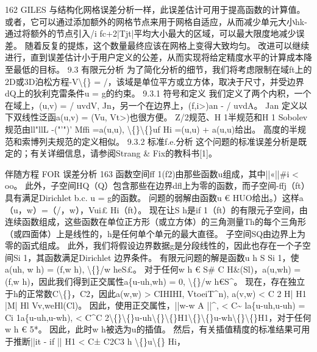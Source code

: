 \documentclass[UTF8,11pt,a4paper,openany,fontset=fandol]{ctexbook}
\begin{document}
162 GILES 与结构化网格误差分析一样，此误差估计可用于提高函数的计算值。 或者，它可以通过添加额外的网格节点来用于网格自适应，从而减少单元大小hk-通过将额外的节点引入/i fc+2|Tjt|平均大小最大的区域，可以最大限度地减少误差。 随着反复的提炼，这个数量最终应该在网格上变得大致均匀。 改进可以继续进行，直到误差估计小于用户定义的公差，从而实现将给定精度水平的计算成本降至最低的目标。 9.3 有限元分析 为了简化分析的细节，我们将考虑限制在域ft上的2D或3D泊松方程-V\textbackslash\{\} = /，该域是单位平方或立方体，取决于尺寸，并受边界dQ上的狄利克雷条件u = g的约束。 9.3.1 符号和定义 我们定义了两个内积，一个在域上，(u,v) = / uvdV, Jn，另一个在边界上，(f,i>)an - / uvdA。 Jan 定义以下双线性泛函a(u,v) = (Vu, Vt>)也很方便。 Z/2规范、H 1半规范和H 1 Sobolev规范由ll"llL -("'")' Mffi =a(u,u), \textbackslash\{\}\textbackslash\{\}uf Hi =(u,u) + a(u,u)给出。 高度的半规范和索博列夫规范的定义相似。 9.3.2 标准f.e.分析 这个问题的标准误差分析是既定的；有关详细信息，请参阅Strang \& Fix的教科书[1]。

伴随方程 FOR 误差分析 163 函数空间ff 1(f2)由那些函数u组成，其中||«||\#i < oo。 此外，子空间HQ（Q）包含那些在边界dfl上为零的函数，而子空间-ffj（ft）具有满足Dirichlet b.c. u = g的函数。 问题的弱解由函数u € HUO给出。）这样a（u，w）=（/，w），Vui£ Hi（ft）。 现在让S h是if 1（ft）的有限元子空间，由连续函数组成，这些函数在单位正方形（或立方体）的三角测量Th的每个三角形（或四面体）上是线性的，h是任何单个单元的最大直径。 子空间SQ由边界上为零的函式组成。 此外，我们将假设边界数据g是分段线性的，因此也存在一个子空间Si 1，其函数满足Dirichlet 边界条件。 有限元问题的解是函数u h S Si 1，使a(uh, w h) = (f,w h), \textbackslash\{\}/w heS£。 对于任何w h € S\# C H\&(Sl)，a(u,wh) = (f,w h)，因此我们得到正交属性a\{u-uh,wh) = 0, \textbackslash\{\}/w h€S\textasciicircum{}。 现在，存在独立于h的正常数C\textbackslash\{\}，C2，因此a(w,w) > CIHIHI, VtoeiT\textasciicircum{}n), a(v,w) < C 2 H| H1 |M| Hl Vv,weHl(Cl)。 因此，使用正交属性，||w-w A ||\textasciicircum{}, < C\textasciitilde{} la\{u-uh,u-uh) = Ci 1a\{u-uh,u-wh), < C\textasciicircum{}C 2\textbackslash\{\}\textbackslash\{\}u-uh\textbackslash\{\}\textbackslash\{\}H1\textbackslash\{\}\textbackslash\{\}u-wh\textbackslash\{\}\textbackslash\{\}H1，对于任何w h € 5*。 因此，此时w h被选为u的插值。 然后，有关插值精度的标准结果可用于推断||it - if || H1 < C± C2C3 h \textbackslash\{\}u\textbackslash\{\} Hi，
\end{document}
